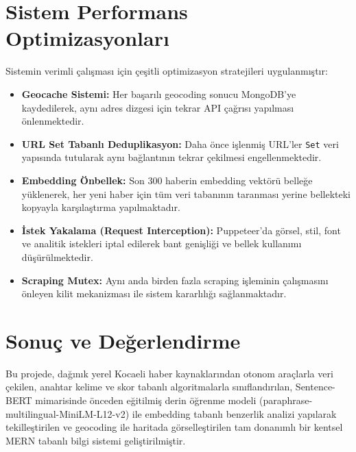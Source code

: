 \documentclass[conference]{IEEEtran}
\begin{document}
    \section{Sistem Performans Optimizasyonlar{\i}}

    Sistemin verimli {\c c}al{\i}{\c s}mas{\i} i{\c c}in {\c c}e{\c s}itli optimizasyon stratejileri uygulanm{\i}{\c s}t{\i}r:

    \begin{itemize}[noitemsep]
    \item \textbf{Geocache Sistemi:} Her ba{\c s}ar{\i}l{\i} geocoding sonucu MongoDB'ye kaydedilerek, ayn{\i} adres dizgesi i{\c c}in tekrar API {\c c}a{\u g}r{\i}s{\i} yap{\i}lmas{\i} {\"o}nlenmektedir.
    \item \textbf{URL Set Tabanl{\i} Deduplikasyon:} Daha {\"o}nce i{\c s}lenmi{\c s} URL'ler \texttt{Set} veri yap{\i}s{\i}nda tutularak ayn{\i} ba{\u g}lant{\i}n{\i}n tekrar {\c c}ekilmesi engellenmektedir.
    \item \textbf{Embedding {\"O}nbellek:} Son 300 haberin embedding vekt{\"o}r{\"u} belle{\u g}e y{\"u}klenerek, her yeni haber i{\c c}in t{\"u}m veri taban{\i}n{\i}n taranmas{\i} yerine bellekteki kopyayla kar{\c s}{\i}la{\c s}t{\i}rma yap{\i}lmaktad{\i}r.
    \item \textbf{{\.I}stek Yakalama (Request Interception):} Puppeteer'da g{\"o}rsel, stil, font ve analitik istekleri iptal edilerek bant geni{\c s}li{\u g}i ve bellek kullan{\i}m{\i} d{\"u}{\c s}{\"u}r{\"u}lmektedir.
    \item \textbf{Scraping Mutex:} Ayn{\i} anda birden fazla scraping i{\c s}leminin {\c c}al{\i}{\c s}mas{\i}n{\i} {\"o}nleyen kilit mekanizmas{\i} ile sistem kararl{\i}l{\i}{\u g}{\i} sa{\u g}lanmaktad{\i}r.
    \end{itemize}

    \section{Sonu{\c c} ve De{\u g}erlendirme}

    Bu projede, da{\u g}{\i}n{\i}k yerel Kocaeli haber kaynaklar{\i}ndan otonom ara{\c c}larla veri {\c c}ekilen, anahtar kelime ve skor tabanl{\i} algoritmalarla s{\i}n{\i}fland{\i}r{\i}lan, Sentence-BERT mimarisinde {\"o}nceden e{\u g}itilmi{\c s} derin {\"o}{\u g}renme modeli (paraphrase-multilingual-MiniLM-L12-v2) ile embedding tabanl{\i} benzerlik analizi yap{\i}larak tekille{\c s}tirilen ve geocoding ile haritada g{\"o}rselle{\c s}tirilen tam donan{\i}ml{\i} bir kentsel MERN tabanl{\i} bilgi sistemi geli{\c s}tirilmi{\c s}tir.
\end{document}
